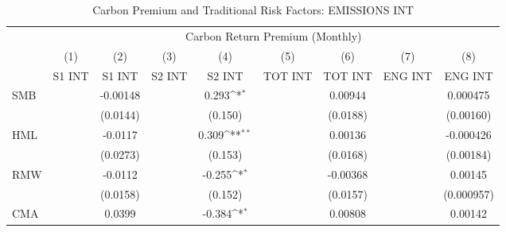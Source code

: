 \begin{table}[htbp]\centering
\def\sym#1{\ifmmode^{#1}\else\(^{#1}\)\fi}
\caption{Carbon Premium and Traditional Risk Factors: EMISSIONS INT}
\begin{tabular}{l*{8}{c}}
\hline\hline
                    &\multicolumn{8}{c}{Carbon Return Premium (Monthly)}                                                                                                                            \\\cmidrule(lr){2-9}
                    &\multicolumn{1}{c}{(1)}&\multicolumn{1}{c}{(2)}&\multicolumn{1}{c}{(3)}&\multicolumn{1}{c}{(4)}&\multicolumn{1}{c}{(5)}&\multicolumn{1}{c}{(6)}&\multicolumn{1}{c}{(7)}&\multicolumn{1}{c}{(8)}\\
                    &\multicolumn{1}{c}{S1 INT}&\multicolumn{1}{c}{S1 INT}&\multicolumn{1}{c}{S2 INT}&\multicolumn{1}{c}{S2 INT}&\multicolumn{1}{c}{TOT INT}&\multicolumn{1}{c}{TOT INT}&\multicolumn{1}{c}{ENG INT}&\multicolumn{1}{c}{ENG INT}\\
\hline
SMB                 &                     &    -0.00148         &                     &       0.293\sym{*}  &                     &     0.00944         &                     &    0.000475         \\
                    &                     &    (0.0144)         &                     &     (0.150)         &                     &    (0.0188)         &                     &   (0.00160)         \\
HML                 &                     &     -0.0117         &                     &       0.309\sym{**} &                     &     0.00136         &                     &   -0.000426         \\
                    &                     &    (0.0273)         &                     &     (0.153)         &                     &    (0.0168)         &                     &   (0.00184)         \\
RMW                 &                     &     -0.0112         &                     &      -0.255\sym{*}  &                     &    -0.00368         &                     &     0.00145         \\
                    &                     &    (0.0158)         &                     &     (0.152)         &                     &    (0.0157)         &                     &  (0.000957)         \\
CMA                 &                     &      0.0399         &                     &      -0.384\sym{*}  &                     &     0.00808         &                     &     0.00142         \\

\end{tabular}
\end{table}
